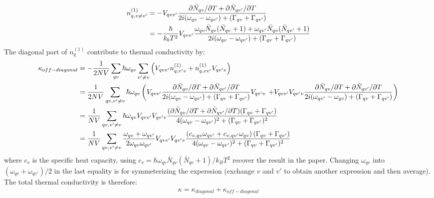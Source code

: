 \documentclass{article}
\begin{document}
\begin{align}
    n^{(1)}_{q,v\neq v'} &= - V_{qvv'} 
        \frac{\partial \bar{N}_{qv} / \partial T + \partial \bar{N}_{qv'} / \partial T }{2i(\omega_{qv}-\omega_{qv'}) + (\Gamma_{qv} + \Gamma_{qv'}) } \notag \\
    &= -\frac{\hbar}{k_b T^2} V_{qvv'}  
    \frac{\omega_{qv}\bar{N}_{qv} (\bar{N}_{qv} + 1) + \omega_{qv'} \bar{N}_{qv} (\bar{N}_{qv'} + 1)}{2i(\omega_{qv} - \omega_{qv'}) + (\Gamma_{qv}+ \Gamma_{qv'})}
\end{align}
The diagonal part of $n^{(1)}_{q}$ contribute to thermal conductivity by:
\begin{align}
    \kappa_{off-diagonal} &= -\frac{1}{2NV} \sum_{qv} \hbar\omega_{qv} \sum_{v'\neq v} \left( V_{qvv'}n^{(1)}_{q,v' v}  + n^{(1)}_{q,vv'} V_{qv'v} \right) \notag \\
        &= \frac{1}{2NV} \sum_{qv,v'\neq v}\hbar\omega_{qv} \left( V_{qvv'} \frac{\partial \bar{N}_{qv} / \partial T + \partial \bar{N}_{qv'} / \partial T }{2i(\omega_{qv}-\omega_{qv'}) + (\Gamma_{qv} + \Gamma_{qv'}) } V_{qv'v} \right.
        \left. + V_{qvv'}V_{qv'v} \frac{\partial \bar{N}_{qv} / \partial T + \partial \bar{N}_{qv'} / \partial T }{2i(\omega_{qv'}-\omega_{qv}) + (\Gamma_{qv} + \Gamma_{qv'}) } \right)  \notag \\
        &= \frac{1}{NV}  \sum_{qv,v'\neq v} \hbar \omega_{qv} V_{qvv'}V_{qv'v} 
        \frac{(\partial \bar{N}_{qv} / \partial T + \partial \bar{N}_{qv'} / \partial T )(\Gamma_{qv}+ \Gamma_{qv'})}{4(\omega_{qv} - \omega_{qv'})^2 + (\Gamma_{qv}+ \Gamma_{qv'})^2} \notag \\
        &= \frac{1}{NV}  \sum_{qv,v'\neq v}\frac{\omega_{qv}+\omega_{qv'}}{2\omega_{qv}\omega_{qv'}} V_{qvv'}V_{qv'v} 
        \frac{ \left( c_{v,qv}\omega_{qv'} + c_{v,qv'}\omega_{qv} \right)(\Gamma_{qv}+ \Gamma_{qv'}) }{4(\omega_{qv} - \omega_{qv'})^2 + (\Gamma_{qv}+ \Gamma_{qv'})^2}
\end{align}
where $c_v$ is the specific heat capacity, using $c_v = \hbar\omega_{qv} \bar{N}_{qv}(\bar{N}_{qv}+1) / k_B T^2$ recover the result in the paper. Changing 
$\omega_{qv}$ into $(\omega_{qv} + \omega_{qv'})/2$ in the last equality is for symmeterizing the experssion (exchange $v$ and $v'$ to obtain another expression and then average).
The total thermal conductivity is therefore:
\begin{equation}
    \kappa = \kappa_{diagonal} + \kappa_{off-diagonal}
\end{equation}
\end{document}
